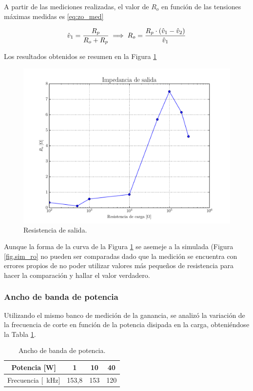A partir de las mediciones realizadas, el valor de $R_o$ en función de las tensiones máximas medidas es \eqref{eq:zo_med}

\begin{equation}
	\centering
	\hat{v}_1 = \frac{R_p}{R_o + R_p} \implies R_o = \frac{R_p \cdot (\hat{v}_1 - \hat{v}_2)}{\hat{v}_1}
	\label{eq:zo_med}
\end{equation}


Los resultados obtenidos se resumen en la Figura \ref{fig:zo_med}

\begin{figure}[H]
	\centering
	\includegraphics[scale=0.5]{./Figuras/med_zo.pdf}
	\caption{Resistencia de salida.}
	\label{fig:zo_med}
\end{figure}

	Aunque la forma de la curva de la Figura \ref{fig:zo_med} se asemeje a la simulada (Figura \ref{fig.sim_ro} no pueden ser comparadas dado que la medición se encuentra con errores propios de no poder utilizar valores más pequeños de resistencia para hacer la comparación y hallar el valor verdadero.

\subsubsection{Ancho de banda de potencia}

Utilizando el mismo banco de medición de la ganancia, se analizó la variación de la frecuencia de corte en función de la potencia disipada en la carga, obteniéndose la Tabla \ref{tab.bw_pote}.

\begin{table}[H]
	\centering
	\begin{tabular}{cccc}
		\toprule
		Potencia [W] & 1 & 10 & 40 \\
		\midrule
		Frecuencia [\SI{}{\kilo\hertz}] & 153,8 & 153 & 120 \\
		\bottomrule
	\end{tabular}
	\caption{Ancho de banda de potencia.}
	\label{tab.bw_pote}
\end{table}

